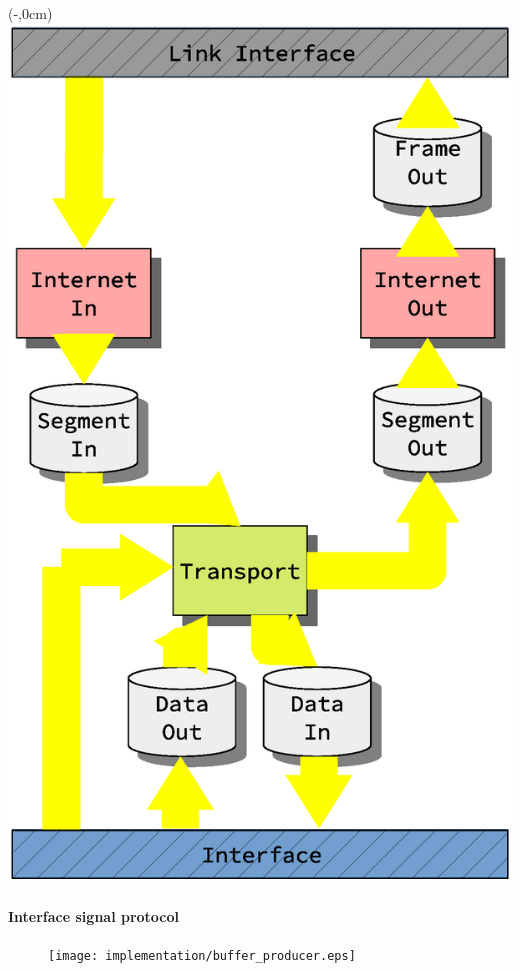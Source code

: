 \begin{frame}[fragile]
    \begin{textblock*}{\displayThumbnail}(\paperwidth-\displayThumbnail-0.2cm,0cm) %
        \colorbox{white}{\includegraphics[width=\textwidth]{implementation/design_2_busses.eps}}
    \end{textblock*}
    \frametitle{\ImplementationTitle}
    \framesubtitle{Interface signal protocol}
        \begin{figure}
                \centering
                \texttt{[image: implementation/buffer\_producer.eps]}
       \end{figure}
\end{frame}




